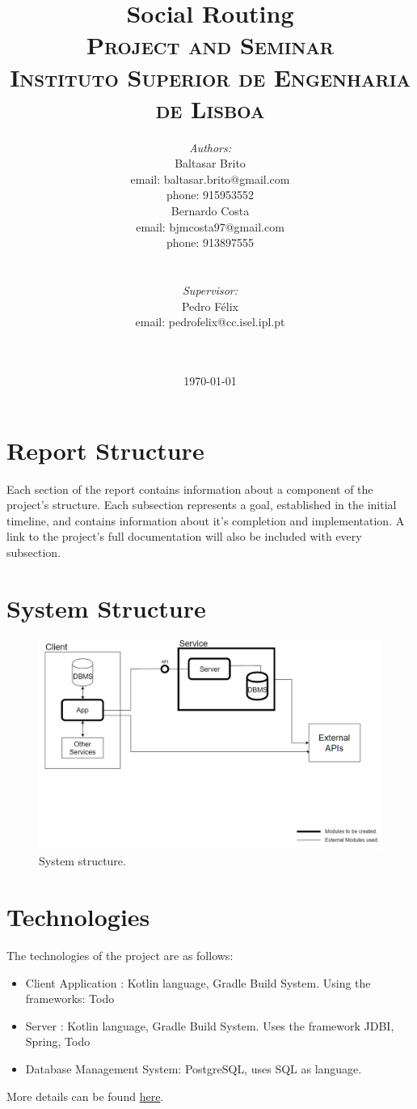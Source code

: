 \documentclass{article}
\title{
    \vspace{-4.0cm}
    {\Huge Social Routing}\\[0.5cm]    
    \textsc{\Large Project and Seminar}\\[0.5cm]
    \textsc{\large Instituto Superior de Engenharia de Lisboa}\\[0.5cm]
}
\date{\today}
\author{   
    \begin{minipage}{0.4\textwidth}
        \begin{flushleft} \large
        \emph{Authors:}\\
        Baltasar Brito\\
        {\small email: baltasar.brito@gmail.com}\\
        {\small phone: 915953552}\\
        Bernardo Costa\\
        {\small email: bjmcosta97@gmail.com}\\
        {\small phone: 913897555}\\
        \end{flushleft}
    \end{minipage}
    ~
    \begin{minipage}{0.4\textwidth}
        \begin{flushright} \large
        \emph{Supervisor:} \\ 
        Pedro Félix\\
        {\small email: pedrofelix@cc.isel.ipl.pt}\\  
        \end{flushright}
    \end{minipage}\\[2cm]  
}
\begin{document}
     
    
    \maketitle

    \newpage

    \tableofcontents

    \newpage

    
    
    \newpage
    \section{Report Structure}
    Each section of the report contains information about a component of the project's structure. 
    Each subsection represents a goal, established in the initial timeline, and contains information about it's completion and implementation. A link to the project's full documentation will also be included with every subsection.
    
    \section{System Structure}

    \begin{figure}[h]            
        \includegraphics[width=\textwidth]{images/project-structure/system-structure.PNG}
        \caption{System structure.}
    \end{figure}  

    \newpage

    \section{Technologies}
    The technologies of the project are as follows:
    \begin{itemize}
        \item Client Application : Kotlin language, Gradle Build System. Using the frameworks: Todo
        \item Server : Kotlin language, Gradle Build System. Uses the framework JDBI, Spring, Todo
        \item Database Management System: PostgreSQL, uses SQL as language.
    \end{itemize}
    More details can be found \href{https://github.com/baltasarb/social-routing/wiki/1.-Choice-Of-Technologies}{here}.
\end{document}

